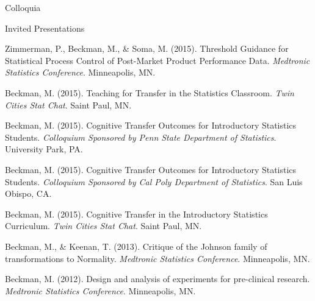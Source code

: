 \documentclass{resume} %
\begin{document}

\begin{rSection}{Colloquia}
	

	\begin{rSubsection}{Invited Presentations}{}{}{}
		
		\item[] Zimmerman, P., Beckman, M., \& Soma, M. (2015). Threshold Guidance for Statistical Process Control of Post-Market Product Performance Data. \textit{Medtronic Statistics Conference}. Minneapolis, MN. \vspace{0.5em}

		\item[] Beckman, M. (2015). Teaching for Transfer in the Statistics Classroom. \textit{Twin Cities Stat Chat}. Saint Paul, MN. \vspace{0.5em}

		\item[] Beckman, M. (2015). Cognitive Transfer Outcomes for Introductory Statistics Students. \textit{Colloquium Sponsored by Penn State Department of Statistics}. University Park, PA. \vspace{0.5em}
		
		\item[] Beckman, M. (2015). Cognitive Transfer Outcomes for Introductory Statistics Students. \textit{Colloquium Sponsored by Cal Poly Department of Statistics}. San Luis Obispo, CA. \vspace{0.5em}		
		
		\item[] Beckman, M. (2015). Cognitive Transfer in the Introductory Statistics Curriculum. \textit{Twin Cities Stat Chat}. Saint Paul, MN. \vspace{0.5em}	

		\item[] Beckman, M., \& Keenan, T. (2013). Critique of the Johnson family of transformations to Normality. \textit{Medtronic Statistics Conference}. Minneapolis, MN. \vspace{0.5em}
	
		\item[] Beckman, M. (2012). Design and analysis of experiments for pre-clinical research.  \textit{Medtronic Statistics Conference}. Minneapolis, MN. \vspace{0.5em}
		

\end{rSubsection}
\end{rSection}
\end{document}
